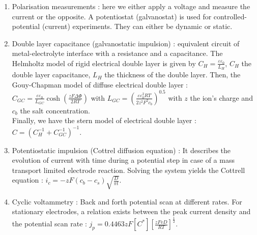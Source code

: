 \documentclass[../main.tex]{subfiles}
\begin{document}
\begin{enumerate}
    \item Polarisation measurements : here we either apply a voltage and measure the current or the opposite.
        A potentiostat (galvanostat) is used for controlled-potential (current) experiments. 
    They can either be dynamic or static.
    
    \item Double layer capacitance (galvanostatic impulsion) : equivalent circuit of metal-electrolyte interface with a resistance and a capacitance. The Helmholtz model of rigid electrical double layer is given by $C_H = \frac{\varepsilon\varepsilon_0}{L_H}$, $C_H$ the double layer capacitance, $L_H$ the thickness of the double layer. Then, the Gouy-Chapman model of diffuse electrical double layer : $C_{GC} = \frac{\varepsilon \varepsilon_0}{L_{GC}} \cosh(\frac{zF \Delta \Phi}{2RT})$ with $L_{GC} = (\frac{\varepsilon \varepsilon_0^2 RT}{2z^2 F^2 c_b})^{0.5}$ with $z$ the ion's charge and $c_b$ the salt concentration.\\
    Finally, we have the stern model of electrical double layer : $C = (C_H^{-1} + C_{GC}^{-1})^{-1}$.\\
    

    
    \item Potentiostatic impulsion (Cottrel diffusion equation) :
    It describes the evolution of current with time during a potential step in case of a mass transport limited electrode reaction. Solving the system yields the Cottrell equation : $i_c = -z F(c_b-c_s) \sqrt{\frac{D}{\pi t}}$.\\
    
    \item Cyclic voltammetry :
    Back and forth potential scan at different rates. For stationary electrodes, a relation exists between the peak current density and the potential scan rate : $j_p = 0.4463 z F[C^*] [\frac{z FvD}{RT}]^{\frac{1}{2}}$.\\
    

\end{enumerate}
\end{document}
